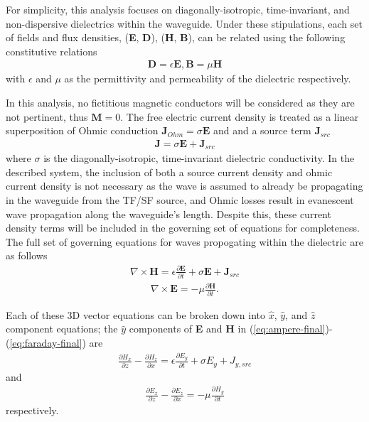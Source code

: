 For simplicity, this analysis focuses on diagonally-isotropic, time-invariant, and non-dispersive dielectrics within the waveguide. Under these stipulations, each set of fields and flux densities, (\textbf{E}, \textbf{D}), (\textbf{H}, \textbf{B}), can be related using the following constitutive relations
\begin{align}
	\textbf{D}=\epsilon\textbf{E}, \textbf{B}=\mu\textbf{H}
	\label{eq:cor}
\end{align}
with $\epsilon$ and $\mu$ as the permittivity and permeability of the dielectric respectively.

In this analysis, no fictitious magnetic conductors will be considered as they are not pertinent, thus $\textbf{M} = 0$. The free electric current density is treated as a linear superposition of Ohmic conduction $\textbf{J}_{Ohm}=\sigma\textbf{E}$ and and a source term $\textbf{J}_{src}$
\begin{align}
	\textbf{J} = \sigma\textbf{E} + \textbf{J}_{src}
	\label{eq:current}
\end{align}
where $\sigma$ is the diagonally-isotropic, time-invariant dielectric conductivity. In the described system, the inclusion of both a source current density and ohmic current density is not necessary as the wave is assumed to already be propagating in the waveguide from the TF/SF source, and Ohmic losses result in evanescent wave propagation along the waveguide's length. Despite this, these current density terms will be included in the governing set of equations for completeness. The full set of governing equations for waves propogating within the dielectric are as follows
\begin{align}
    \nabla\times\textbf{H} = \epsilon\frac{\partial\textbf{E}}{\partial t} + \sigma\textbf{E} + \textbf{J}_{src}
    \label{eq:ampere-final}
\end{align}
\begin{align}
    \nabla\times\textbf{E}=-\mu\frac{\partial\textbf{H}}{\partial t}.
    \label{eq:faraday-final}
\end{align}

Each of these 3D vector equations can be broken down into $\hat{x}$, $\hat{y}$, and $\hat{z}$ component equations; the $\hat{y}$ components of \textbf{E} and \textbf{H} in  (\ref{eq:ampere-final})-(\ref{eq:faraday-final}) are
\begin{align}
	\frac{\partial H_x}{\partial z} - \frac{\partial H_z}{\partial x} = \epsilon\frac{\partial E_y}{\partial t} + \sigma E_y + J_{y,src}
	\label{ampere-full-ey}
\end{align}
and
\begin{align}
	\frac{\partial E_x}{\partial z} - \frac{\partial E_z}{\partial x} =-\mu\frac{\partial H_y}{\partial t}
	\label{faraday-full-hy}
\end{align}
respectively.

